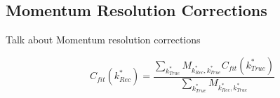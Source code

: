 \documentclass[../AnalysisNoteJBuxton.tex]{subfiles}
\begin{document}
\subsection{Momentum Resolution Corrections}
\label{MomentumResolutionCorrections}

Talk about Momentum resolution corrections

\begin{equation}
  C_{fit}(k^{*}_{Rec}) = \dfrac{\sum\limits_{k^{*}_{True}}M_{k^{*}_{Rec},k^{*}_{True}}C_{fit}(k^{*}_{True})}{\sum\limits_{k^{*}_{True}}M_{k^{*}_{Rec},k^{*}_{True}}}
\label{eqn:MomResCorrection}
\end{equation}
\end{document}
